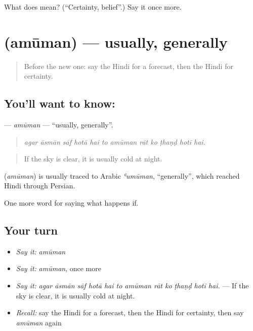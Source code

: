 \begin{tcolorbox}[breakable,colback=teal!4,colframe=teal!35!black,title={Before you move on}]
What does  mean? (\textquotedblleft{}Certainty, belief\textquotedblright{}.) Say it once more.
\end{tcolorbox}
\section[\texorpdfstring{\hi{अमूमन} (amūman)}{अमूमन (amūman)}]{ (amūman) — usually, generally}

\label{lesson:HI-C374-amuman}



\begin{quote}
Before the new one: say the Hindi for a forecast, then the Hindi for certainty.
\end{quote}

\subsection*{You'll want to know: }
\textbf{} — \emph{amūman} — \textquotedblleft{}usually, generally\textquotedblright{}.

\begin{quote}
           
\end{quote}

\begin{quote}
\emph{agar āsmān sāf hotā hai to amūman rāt ko ṭhaṇḍ hotī hai.}
\end{quote}

\begin{quote}
If the sky is clear, it is usually cold at night.
\end{quote}

\begin{cousinweb}
\textbf{} (\emph{amūman}) is usually traced to Arabic \emph{ʿumūman}, \textquotedblleft{}generally\textquotedblright{}, which reached Hindi through Persian.
\end{cousinweb}

\begin{grammarlens}[title={What you've built}]
One more word for saying what happens if.
\end{grammarlens}

\subsection*{Your turn}
\begin{itemize}
\raggedright
  \item \emph{Say it:} \emph{amūman}
  \item \emph{Say it:} \emph{amūman}, once more
  \item \emph{Say it:} \emph{agar āsmān sāf hotā hai to amūman rāt ko ṭhaṇḍ hotī hai.} — If the sky is clear, it is usually cold at night.
  \item \emph{Recall:} say the Hindi for a forecast, then the Hindi for certainty, then say \emph{amūman} again
\end{itemize}

